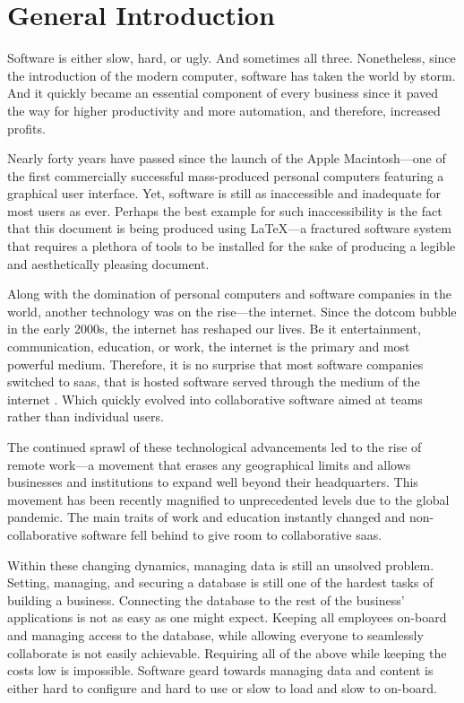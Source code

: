 \chapter*{General Introduction}

Software is either slow, hard, or ugly.
And sometimes all three.
Nonetheless, since the introduction of the modern computer, software has taken the world by storm.
And it quickly became an essential component of every business since it paved the way for higher productivity and more automation, and therefore, increased profits.

Nearly forty years \parencite{noauthor_macintosh_2010} have passed since the launch of the Apple Macintosh---one of the first commercially successful \parencite{polsson_chronology_2009} mass-produced personal computers featuring a graphical user interface.
Yet, software is still as inaccessible and inadequate for most users as ever.
Perhaps the best example for such inaccessibility is the fact that this document is being produced using \LaTeX---a fractured software system that requires a plethora of tools to be installed for the sake of producing a legible and aesthetically pleasing document.

Along with the domination of personal computers and software companies in the world, another technology was on the rise---the internet. Since the dotcom bubble in the early 2000s, the internet has reshaped our lives.
Be it entertainment, communication, education, or work, the internet is the primary and most powerful medium.
Therefore, it is no surprise that most software companies switched to \acrfull{saas}, that is hosted software served through the medium of the internet \cite{december_2019_what_nodate}. Which quickly evolved into collaborative software aimed at teams rather than individual users.

The continued sprawl of these technological advancements led to the rise of remote work---a movement that erases any geographical limits and allows businesses and institutions to expand well beyond their headquarters. This movement has been recently magnified to unprecedented levels due to the global pandemic. The main traits of work and education instantly changed and non-collaborative software fell behind to give room to collaborative \acrshort{saas}.

Within these changing dynamics, managing data is still an unsolved problem. Setting, managing, and securing a database is still one of the hardest tasks of building a business. Connecting the database to the rest of the business' applications is not as easy as one might expect. Keeping all employees on-board and managing access to the database, while allowing everyone to seamlessly collaborate is not easily achievable. Requiring all of the above while keeping the costs low is impossible. Software geard towards managing data and content is either hard to configure and hard to use or slow to load and slow to on-board.

